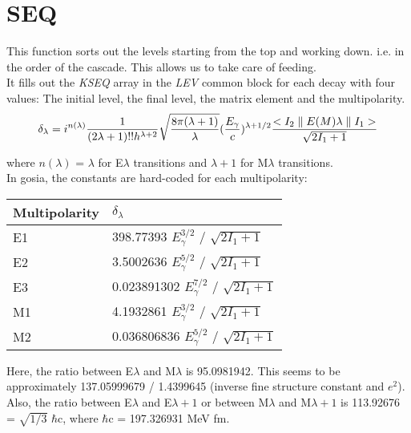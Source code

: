 \section{SEQ}
\label{sect:seq}

\noindent This function sorts out the levels starting from the top and
working down. i.e. in the order of the cascade. This allows us to take care
of feeding.\\

\noindent It fills out the {\em KSEQ} array in the {\em LEV} common block
for each decay with four values: The initial level, the final level, the
matrix element and the multipolarity.\\

\begin{equation}
\delta_\lambda =
i^{n(\lambda)}
{1 \over (2 \lambda + 1)!! h^{\lambda + 2}}
\sqrt{8 \pi (\lambda + 1) \over \lambda}
\large({E_\gamma \over c}\large)^{\lambda + 1/2}
{<I_2 \parallel E(M)\lambda \parallel I_1> \over \sqrt{2 I_1 + 1}}
\end{equation}

\noindent where $n(\lambda)$ = $\lambda$ for E$\lambda$ transitions and
$\lambda + 1$ for M$\lambda$ transitions.\\

\noindent In gosia, the constants are hard-coded for each multipolarity:\\

\begin{center}
\begin{tabular}{|ll|}
\hline
Multipolarity & $\delta_\lambda$\\
\hline
E1 & 398.77393 $E_\gamma^{3/2}$ / $\sqrt{2 I_1 + 1}$\\
E2 & 3.5002636 $E_\gamma^{5/2}$ / $\sqrt{2 I_1 + 1}$\\
E3 & 0.023891302 $E_\gamma^{7/2}$ / $\sqrt{2 I_1 + 1}$\\
M1 & 4.1932861 $E_\gamma^{3/2}$ / $\sqrt{2 I_1 + 1}$\\
M2 & 0.036806836 $E_\gamma^{5/2}$ / $\sqrt{2 I_1 + 1}$\\
\hline
\end{tabular}
\end{center}

\noindent Here, the ratio between E$\lambda$ and M$\lambda$ is 95.0981942.
This seems to be approximately 137.05999679 / 1.4399645 (inverse fine
structure constant and $e^2$).\\


\noindent Also, the ratio between E$\lambda$ and E$\lambda+1$ or between
M$\lambda$ and M$\lambda+1$ is 113.92676 = $\sqrt{1/3}$ $\hbar$c, where
$\hbar$c = 197.326931 MeV fm.\\
